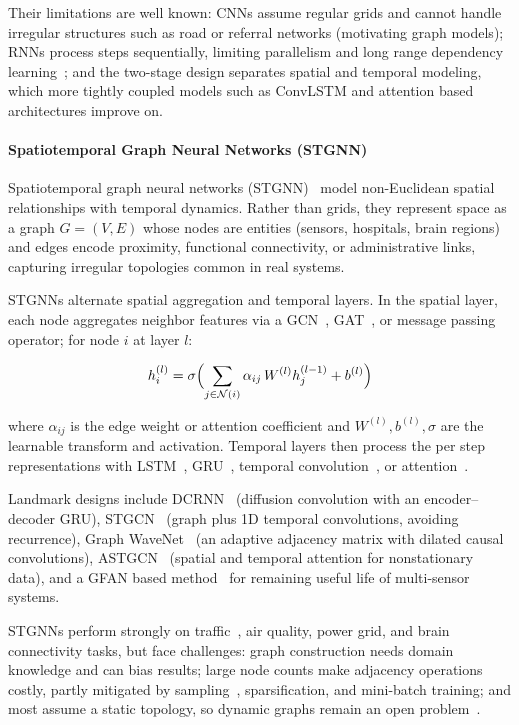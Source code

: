 \documentclass[journal]{IEEEtran}
\begin{document}
Their limitations are well known: CNNs assume regular grids and cannot handle irregular structures such as road or referral networks (motivating graph models); RNNs process steps sequentially, limiting parallelism and long range dependency learning~\cite{bengio1994learning}; and the two-stage design separates spatial and temporal modeling, which more tightly coupled models such as ConvLSTM and attention based architectures improve on.
 
\paragraph{Spatiotemporal Graph Neural Networks (STGNN)}
Spatiotemporal graph neural networks (STGNN)~\cite{shao2022longterm} model non-Euclidean spatial relationships with temporal dynamics. Rather than grids, they represent space as a graph $G=(V,E)$ whose nodes are entities (sensors, hospitals, brain regions) and edges encode proximity, functional connectivity, or administrative links, capturing irregular topologies common in real systems.
 
STGNNs alternate spatial aggregation and temporal layers. In the spatial layer, each node aggregates neighbor features via a GCN~\cite{kipf2017gcn}, GAT~\cite{velickovic2018gat}, or message passing operator; for node $i$ at layer $l$:
 
\begin{equation}
h_i^{(l)} = \sigma \Bigl( \sum_{j \in \mathcal{N}(i)} \alpha_{ij} \, W^{(l)} h_j^{(l-1)} + b^{(l)} \Bigr)
\end{equation}
 
where $\alpha_{ij}$ is the edge weight or attention coefficient and $W^{(l)},b^{(l)},\sigma$ are the learnable transform and activation. Temporal layers then process the per step representations with LSTM~\cite{rnn_lstm}, GRU~\cite{cho2014gru}, temporal convolution~\cite{lea2017temporal}, or attention~\cite{vaswani2017attention}.
 
Landmark designs include DCRNN~\cite{li2018dcrnn} (diffusion convolution with an encoder--decoder GRU), STGCN~\cite{yu2018spatio} (graph plus 1D temporal convolutions, avoiding recurrence), Graph WaveNet~\cite{wu2019graphwavenet} (an adaptive adjacency matrix with dilated causal convolutions), ASTGCN~\cite{guo2019astgcn} (spatial and temporal attention for nonstationary data), and a GFAN based method~\cite{wang2025rul} for remaining useful life of multi-sensor systems.
 
STGNNs perform strongly on traffic~\cite{yu2018spatio, li2018dcrnn}, air quality, power grid, and brain connectivity tasks, but face challenges: graph construction needs domain knowledge and can bias results; large node counts make adjacency operations costly, partly mitigated by sampling~\cite{hamilton2017inductive}, sparsification, and mini-batch training; and most assume a static topology, so dynamic graphs remain an open problem~\cite{pareja2020evolvegcn}.
 
\end{document}
